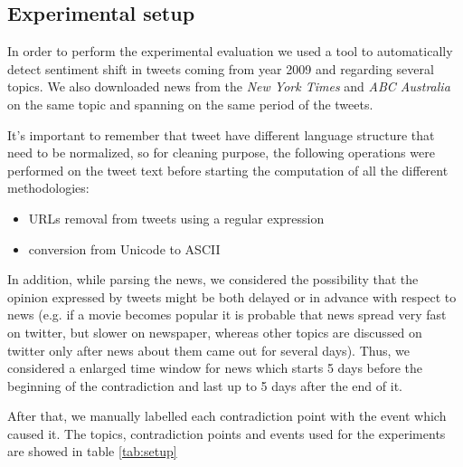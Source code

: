 \subsection*{Experimental setup}
In order to perform the experimental evaluation we used a tool to automatically
detect sentiment shift in tweets coming from year 2009 and regarding several
topics. We also downloaded news from the \emph{New York Times} and \emph{ABC
Australia} on the same topic and spanning on the same period of the tweets.

It's important to remember that tweet have different language structure that need to be normalized, so for cleaning purpose, the following operations were performed on the tweet text before starting the computation of all the different methodologies:
\begin{itemize}
	\item URLs removal from tweets using a regular expression
	\item conversion from Unicode to ASCII
\end{itemize}

In addition, while parsing the news, we considered the possibility that the
opinion expressed by tweets might be both delayed or in advance with respect to
news (e.g. if a movie becomes popular it is probable that news spread very fast
on twitter, but slower on newspaper, whereas other topics are discussed on
twitter only after news about them came out for several days). Thus, we
considered a enlarged time window for news which starts 5 days before the
beginning of the contradiction and last up to 5 days after the end of it.

After that, we manually labelled each contradiction point with the event which
caused it. The topics, contradiction points and events used for the experiments
are showed in table \ref{tab:setup}

